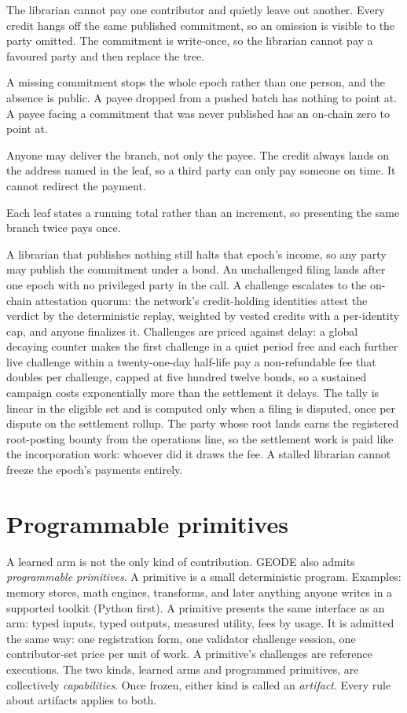 \documentclass[11pt]{article}
\begin{document}
The librarian cannot pay one contributor and quietly leave out
another. Every credit hangs off the same published commitment, so
an omission is visible to the party omitted. The commitment is
write-once, so the librarian cannot pay a favoured party and then
replace the tree.

A missing commitment stops the whole epoch rather than one
person, and the absence is public. A payee dropped from a pushed
batch has nothing to point at. A payee facing a commitment that
was never published has an on-chain zero to point at.

Anyone may deliver the branch, not only the payee. The credit
always lands on the address named in the leaf, so a third party
can only pay someone on time. It cannot redirect the payment.

Each leaf states a running total rather than an increment, so
presenting the same branch twice pays once.

A librarian that publishes nothing still halts that epoch's
income, so any party may publish the commitment under a bond.
An unchallenged filing lands after one epoch with no privileged
party in the call. A challenge escalates to the on-chain
attestation quorum: the network's credit-holding identities
attest the verdict by the deterministic replay, weighted by
vested credits with a per-identity cap, and anyone finalizes it.
Challenges are priced against delay: a global decaying counter
makes the first challenge in a quiet period free and each further
live challenge within a twenty-one-day half-life pay a
non-refundable fee that doubles per challenge, capped at five
hundred twelve bonds, so a sustained campaign costs exponentially
more than the settlement it delays. The tally is linear in the
eligible set and is computed only when
a filing is disputed, once per dispute on the settlement rollup.
The party whose root lands earns the registered root-posting
bounty from the operations line, so the settlement
work is paid like the incorporation work: whoever did it draws
the fee. A stalled librarian cannot freeze the epoch's payments
entirely.

\section{Programmable primitives}

A learned arm is not the only kind of contribution. GEODE also
admits \emph{programmable primitives}. A primitive is a small
deterministic program. Examples: memory stores, math engines,
transforms, and later anything anyone writes in a supported
toolkit (Python first). A primitive presents the same interface
as an arm: typed inputs, typed outputs, measured utility, fees by
usage. It is admitted the same way: one registration form, one
validator challenge session, one contributor-set price per unit
of work. A primitive's challenges are reference executions. The
two kinds, learned arms and programmed primitives, are
collectively \emph{capabilities}. Once frozen, either kind is
called an \emph{artifact}. Every rule about artifacts applies to
both.
\end{document}
